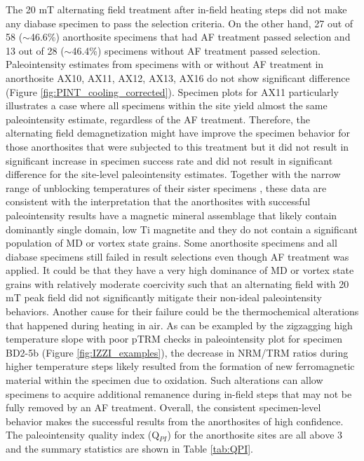 \documentclass[draft]{agujournal2019}
\begin{document}
The 20 mT alternating field treatment after in-field heating steps did not make any diabase specimen to pass the selection criteria. On the other hand, 27 out of 58 ($\sim$46.6\%) anorthosite specimens that had AF treatment passed selection and 13 out of 28 ($\sim$46.4\%) specimens without AF treatment passed selection. Paleointensity estimates from specimens with or without AF treatment in anorthosite AX10, AX11, AX12, AX13, AX16 do not show significant difference (Figure \ref{fig:PINT_cooling_corrected}). Specimen plots for AX11 particularly illustrates a case where all specimens within the site yield almost the same paleointensity estimate, regardless of the AF treatment. Therefore, the alternating field demagnetization might have improve the specimen behavior for those anorthosites that were subjected to this treatment but it did not result in significant increase in specimen success rate and did not result in significant difference for the site-level paleointensity estimates. Together with the narrow range of unblocking temperatures of their sister specimens \cite{Zhang2021b}, these data are consistent with the interpretation that the anorthosites with successful paleointensity results have a magnetic mineral assemblage that likely contain dominantly single domain, low Ti magnetite and they do not contain a significant population of MD or vortex state grains. Some anorthosite specimens and all diabase specimens still failed in result selections even though AF treatment was applied. It could be that they have a very high dominance of MD or vortex state grains with relatively moderate coercivity such that an alternating field with 20 mT peak field did not significantly mitigate their non-ideal paleointensity behaviors. Another cause for their failure could be the thermochemical alterations that happened during heating in air. As can be exampled by the zigzagging high temperature slope with poor pTRM checks in paleointensity plot for specimen BD2-5b (Figure \ref{fig:IZZI_examples}), the decrease in NRM/TRM ratios during higher temperature steps likely resulted from the formation of new ferromagnetic material within the specimen due to oxidation. Such alterations can allow specimens to acquire additional remanence during in-field steps that may not be fully removed by an AF treatment. Overall, the consistent specimen-level behavior makes the successful results from the anorthosites of high confidence. The paleointensity quality index (Q$_{PI}$) for the anorthosite sites are all above 3 and the summary statistics are shown in Table \ref{tab:QPI}. 
\end{document}

